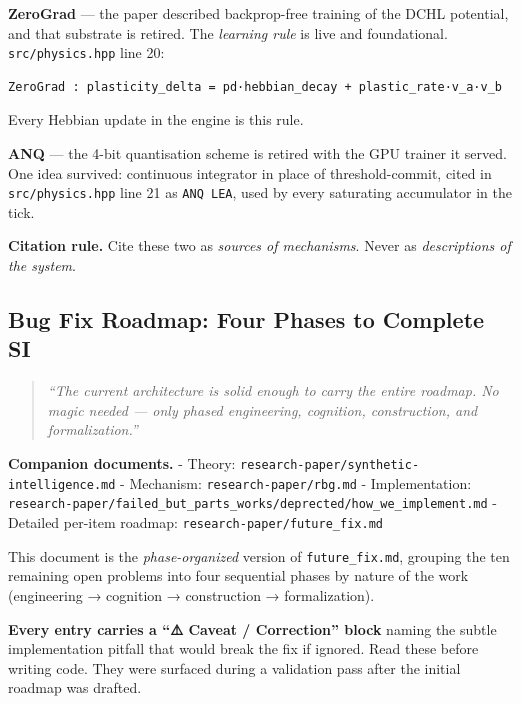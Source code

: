 \documentclass[
  11pt,
  a4paper,
]{article}
\begin{document}
\textbf{ZeroGrad} --- the paper described backprop-free training of the
DCHL potential, and that substrate is retired. The \emph{learning rule}
is live and foundational. \texttt{src/physics.hpp} line 20:

\begin{verbatim}
ZeroGrad : plasticity_delta = pd·hebbian_decay + plastic_rate·v_a·v_b
\end{verbatim}

Every Hebbian update in the engine is this rule.

\textbf{ANQ} --- the 4-bit quantisation scheme is retired with the GPU
trainer it served. One idea survived: continuous integrator in place of
threshold-commit, cited in \texttt{src/physics.hpp} line 21 as
\texttt{ANQ\ LEA}, used by every saturating accumulator in the tick.

\textbf{Citation rule.} Cite these two as \emph{sources of mechanisms}.
Never as \emph{descriptions of the system}.

\newpage

\subsection{Bug Fix Roadmap: Four Phases to Complete
SI}\label{bug-fix-roadmap-four-phases-to-complete-si}

\begin{quote}
\emph{``The current architecture is solid enough to carry the entire
roadmap. No magic needed --- only phased engineering, cognition,
construction, and formalization.''}
\end{quote}

\textbf{Companion documents.} - Theory:
\texttt{research-paper/synthetic-intelligence.md} - Mechanism:
\texttt{research-paper/rbg.md} - Implementation:
\texttt{research-paper/failed\_but\_parts\_works/deprected/how\_we\_implement.md}
- Detailed per-item roadmap: \texttt{research-paper/future\_fix.md}

This document is the \emph{phase-organized} version of
\texttt{future\_fix.md}, grouping the ten remaining open problems into
four sequential phases by nature of the work (engineering → cognition →
construction → formalization).

\textbf{Every entry carries a ``⚠️ Caveat / Correction'' block} naming
the subtle implementation pitfall that would break the fix if ignored.
Read these before writing code. They were surfaced during a validation
pass after the initial roadmap was drafted.
\end{document}
